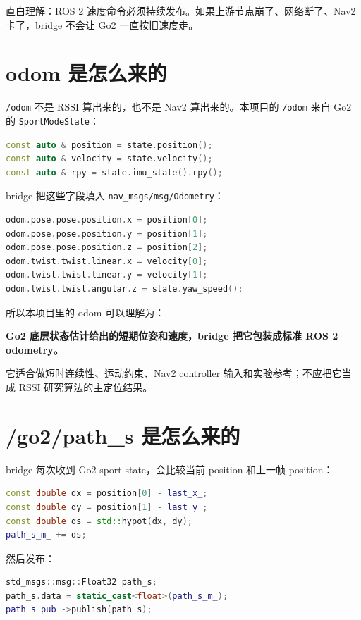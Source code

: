 \documentclass[UTF8,11pt,a4paper,openany]{ctexrep}
\newcommand{\code}[1]{\nolinkurl{#1}}
\newcommand{\topic}[1]{\nolinkurl{#1}}
\newcommand{\msg}[1]{\nolinkurl{#1}}
\begin{document}
直白理解：ROS 2 速度命令必须持续发布。如果上游节点崩了、网络断了、Nav2 卡了，bridge 不会让 Go2 一直按旧速度走。

\section{odom 是怎么来的}

\topic{/odom} 不是 RSSI 算出来的，也不是 Nav2 算出来的。本项目的 \topic{/odom} 来自 Go2 的 \code{SportModeState}：

\begin{lstlisting}[language=cpp]
const auto & position = state.position();
const auto & velocity = state.velocity();
const auto & rpy = state.imu_state().rpy();
\end{lstlisting}

bridge 把这些字段填入 \msg{nav_msgs/msg/Odometry}：

\begin{lstlisting}[language=cpp]
odom.pose.pose.position.x = position[0];
odom.pose.pose.position.y = position[1];
odom.pose.pose.position.z = position[2];
odom.twist.twist.linear.x = velocity[0];
odom.twist.twist.linear.y = velocity[1];
odom.twist.twist.angular.z = state.yaw_speed();
\end{lstlisting}

所以本项目里的 odom 可以理解为：

\begin{center}
  \textbf{Go2 底层状态估计给出的短期位姿和速度，bridge 把它包装成标准 ROS 2 odometry。}
\end{center}

它适合做短时连续性、运动约束、Nav2 controller 输入和实验参考；不应把它当成 RSSI 研究算法的主定位结果。

\section{/go2/path\_s 是怎么来的}

bridge 每次收到 Go2 sport state，会比较当前 position 和上一帧 position：

\begin{lstlisting}[language=cpp]
const double dx = position[0] - last_x_;
const double dy = position[1] - last_y_;
const double ds = std::hypot(dx, dy);
path_s_m_ += ds;
\end{lstlisting}

然后发布：

\begin{lstlisting}[language=cpp]
std_msgs::msg::Float32 path_s;
path_s.data = static_cast<float>(path_s_m_);
path_s_pub_->publish(path_s);
\end{lstlisting}
\end{document}
